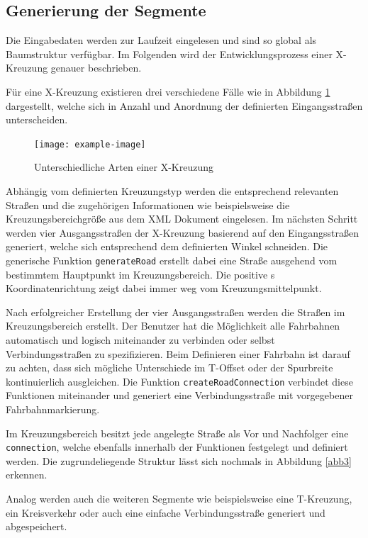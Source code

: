 \subsection{Generierung der Segmente}
Die Eingabedaten werden zur Laufzeit eingelesen und sind so global als Baumstruktur verfügbar. Im Folgenden wird der Entwicklungsprozess einer X-Kreuzung genauer beschrieben.

Für eine X-Kreuzung existieren drei verschiedene Fälle wie in Abbildung \ref{abb4} dargestellt, welche sich in Anzahl und Anordnung der definierten Eingangsstraßen unterscheiden.

\begin{figure}[H]
\flushleft
\texttt{[image: example-image]}
\caption{Unterschiedliche Arten einer X-Kreuzung}
\label{abb4}
\end{figure}

Abhängig vom definierten Kreuzungstyp werden die entsprechend relevanten Straßen und die zugehörigen Informationen wie beispielsweise die Kreuzungsbereichgröße aus dem XML Dokument eingelesen. Im nächsten Schritt werden vier Ausgangsstraßen der X-Kreuzung basierend auf den Eingangsstraßen generiert, welche sich entsprechend dem definierten Winkel schneiden. Die generische Funktion \texttt{generateRoad} erstellt dabei eine Straße ausgehend vom bestimmtem Hauptpunkt im Kreuzungsbereich. Die positive s Koordinatenrichtung zeigt dabei immer weg vom Kreuzungsmittelpunkt.

Nach erfolgreicher Erstellung der vier Ausgangsstraßen werden die Straßen im Kreuzungsbereich erstellt. Der Benutzer hat die Möglichkeit alle Fahrbahnen automatisch und logisch miteinander zu verbinden oder selbst Verbindungsstraßen zu spezifizieren. Beim Definieren einer Fahrbahn ist darauf zu achten, dass sich mögliche Unterschiede im T-Offset oder der Spurbreite kontinuierlich ausgleichen. Die Funktion \texttt{createRoadConnection} verbindet diese Funktionen miteinander und generiert eine Verbindungsstraße mit vorgegebener Fahrbahnmarkierung.

Im Kreuzungsbereich besitzt jede angelegte Straße als Vor und Nachfolger eine \texttt{connection}, welche ebenfalls innerhalb der Funktionen festgelegt und definiert werden. Die zugrundeliegende Struktur lässt sich nochmals in Abbildung \ref{abb3} erkennen.

Analog werden auch die weiteren Segmente wie beispielsweise eine T-Kreuzung, ein Kreisverkehr oder auch eine einfache Verbindungsstraße generiert und abgespeichert.

